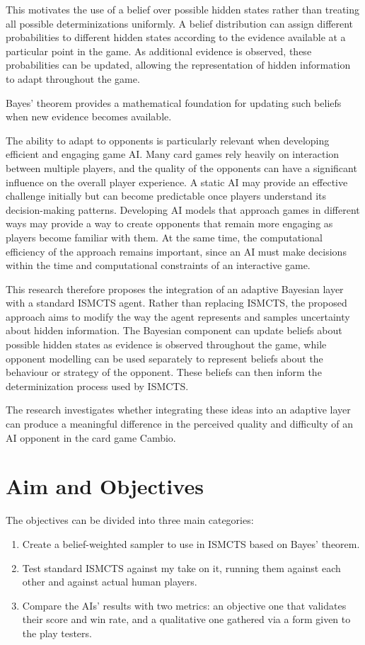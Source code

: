 \documentclass[12pt,a4paper,oneside]{report}
\begin{document}
This motivates the use of a belief over possible hidden states rather than treating all possible determinizations uniformly. A belief distribution can assign different probabilities to different hidden states according to the evidence available at a particular point in the game. As additional evidence is observed, these probabilities can be updated, allowing the representation of hidden information to adapt throughout the game.

Bayes' theorem provides a mathematical foundation for updating such beliefs when new evidence becomes available.

The ability to adapt to opponents is particularly relevant when developing efficient and engaging game AI. Many card games rely heavily on interaction between multiple players, and the quality of the opponents can have a significant influence on the overall player experience. A static AI may provide an effective challenge initially but can become predictable once players understand its decision-making patterns. Developing AI models that approach games in different ways may provide a way to create opponents that remain more engaging as players become familiar with them. At the same time, the computational efficiency of the approach remains important, since an AI must make decisions within the time and computational constraints of an interactive game.

This research therefore proposes the integration of an adaptive Bayesian layer with a standard ISMCTS agent. Rather than replacing ISMCTS, the proposed approach aims to modify the way the agent represents and samples uncertainty about hidden information. The Bayesian component can update beliefs about possible hidden states as evidence is observed throughout the game, while opponent modelling can be used separately to represent beliefs about the behaviour or strategy of the opponent. These beliefs can then inform the determinization process used by ISMCTS.

The research investigates whether integrating these ideas into an adaptive layer can produce a meaningful difference in the perceived quality and difficulty of an AI opponent in the card game Cambio.   


\section{Aim and Objectives}

The objectives can be divided into three main categories:
\begin{enumerate}
    \item Create a belief-weighted sampler to use in ISMCTS based on Bayes' theorem.
    \item Test standard ISMCTS against my take on it, running them against each other and against actual human players.
    \item Compare the AIs' results with two metrics: an objective one that validates their score and win rate, and a qualitative one gathered via a form given to the play testers.
\end{enumerate}
\end{document}
